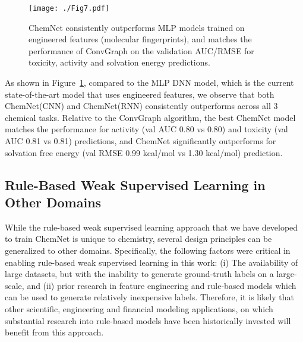 \documentclass[sigconf]{acmart}
\begin{document}
\begin{figure}[!htbp]
\centering
\texttt{[image: ./Fig7.pdf]}
\caption{\small ChemNet consistently outperforms MLP models trained on engineered features (molecular fingerprints), and matches the performance of ConvGraph on the validation AUC/RMSE for toxicity, activity and solvation energy predictions.}
\label{fig:7}
\end{figure}

As shown in Figure~\ref{fig:7}, compared to the MLP DNN model, which is the current state-of-the-art model that uses engineered features, we observe that both ChemNet(CNN) and ChemNet(RNN) consistently outperforms across all 3 chemical tasks. Relative to the ConvGraph algorithm, the best ChemNet model matches the performance for activity (val AUC 0.80 vs 0.80) and toxicity (val AUC 0.81 vs 0.81) predictions, and ChemNet significantly outperforms for solvation free energy (val RMSE 0.99 kcal/mol vs 1.30 kcal/mol) prediction.

\subsection{Rule-Based Weak Supervised Learning in Other Domains}
While the rule-based weak supervised learning approach that we have developed to train ChemNet is unique to chemistry, several design principles can be generalized to other domains. Specifically, the following factors were critical in enabling rule-based weak supervised learning in this work: (i) The availability of large datasets, but with the inability to generate ground-truth labels on a large-scale, and (ii) prior research in feature engineering and rule-based models which can be used to generate relatively inexpensive labels. Therefore, it is likely that other scientific, engineering and financial modeling applications, on which substantial research into rule-based models have been historically invested will benefit from this approach.
\end{document}
